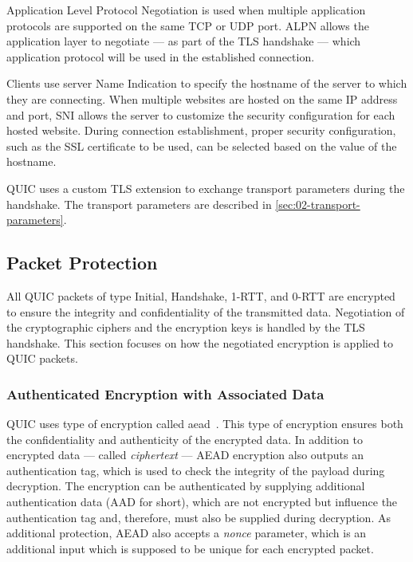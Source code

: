 Application Level Protocol Negotiation is used when multiple application protocols are supported on
the same TCP or UDP port. ALPN allows the application layer to negotiate --- as part of the TLS
handshake --- which application protocol will be used in the established connection.

Clients use server Name Indication to specify the hostname of the server to which they are
connecting. When multiple websites are hosted on the same IP address and port, SNI allows the server
to customize the security configuration for each hosted website. During connection establishment,
proper security configuration, such as the SSL certificate to be used, can be selected based on the
value of the hostname.

QUIC uses a custom TLS extension to exchange transport parameters during the handshake. The
transport parameters are described in \autoref{sec:02-transport-parameters}.

\subsection{Packet Protection}\label{sec:02-packet-protection}

All QUIC packets of type Initial, Handshake, 1-RTT, and 0-RTT are encrypted to ensure the integrity
and confidentiality of the transmitted data. Negotiation of the cryptographic ciphers and the
encryption keys is handled by the TLS handshake. This section focuses on how the negotiated
encryption is applied to QUIC packets.

\subsubsection{Authenticated Encryption with Associated Data}

QUIC uses type of encryption called \gls{aead}~\cite{rfc5116}. This type of encryption ensures both
the confidentiality and authenticity of the encrypted data. In addition to encrypted data --- called
\textit{ciphertext} --- AEAD encryption also outputs an authentication tag, which is used to check
the integrity of the payload during decryption. The encryption can be authenticated by supplying
additional authentication data (AAD for short), which are not encrypted but influence the
authentication tag and, therefore, must also be supplied during decryption. As additional
protection, AEAD also accepts a \textit{nonce} parameter, which is an additional input which is
supposed to be unique for each encrypted packet.

